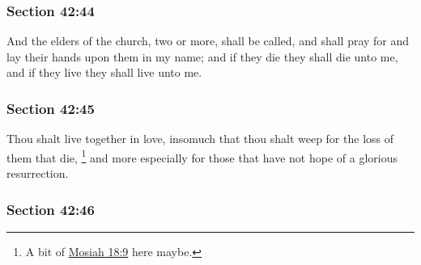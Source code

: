 
	\subsubsection{Section 42:44} %
		\label{DC42-44}

		And the elders of the church, two or more, shall be called, and shall pray for and lay their hands upon them in my name; and if they die they shall die unto me, and if they live they shall live unto me.


	\subsubsection{Section 42:45} %
		\label{DC42-45}

		Thou shalt live together in love, insomuch that thou shalt weep for the loss of them that die,%
			\footnote{%
				A bit of \hyperref[MOSIAH-18-9]{Mosiah 18:9} here maybe.
				}
		and more especially for those that have not hope of a glorious resurrection.


	\subsubsection{Section 42:46} %
		\label{DC42-46}


